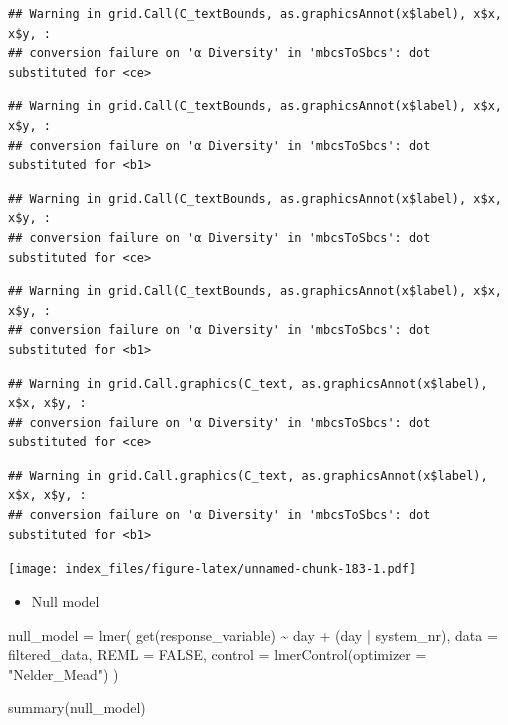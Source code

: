 \documentclass[
]{article}
\newenvironment{Shaded}{\begin{snugshade}}{\end{snugshade}}
\newcommand{\AttributeTok}[1]{\textcolor[rgb]{0.77,0.63,0.00}{#1}}
\newcommand{\ConstantTok}[1]{\textcolor[rgb]{0.00,0.00,0.00}{#1}}
\newcommand{\FunctionTok}[1]{\textcolor[rgb]{0.00,0.00,0.00}{#1}}
\newcommand{\NormalTok}[1]{#1}
\newcommand{\OtherTok}[1]{\textcolor[rgb]{0.56,0.35,0.01}{#1}}
\newcommand{\SpecialCharTok}[1]{\textcolor[rgb]{0.00,0.00,0.00}{#1}}
\newcommand{\StringTok}[1]{\textcolor[rgb]{0.31,0.60,0.02}{#1}}
\providecommand{\tightlist}{%
  \setlength{\itemsep}{0pt}\setlength{\parskip}{0pt}}
\begin{document}
\begin{verbatim}
## Warning in grid.Call(C_textBounds, as.graphicsAnnot(x$label), x$x, x$y, :
## conversion failure on 'α Diversity' in 'mbcsToSbcs': dot substituted for <ce>
\end{verbatim}

\begin{verbatim}
## Warning in grid.Call(C_textBounds, as.graphicsAnnot(x$label), x$x, x$y, :
## conversion failure on 'α Diversity' in 'mbcsToSbcs': dot substituted for <b1>
\end{verbatim}

\begin{verbatim}
## Warning in grid.Call(C_textBounds, as.graphicsAnnot(x$label), x$x, x$y, :
## conversion failure on 'α Diversity' in 'mbcsToSbcs': dot substituted for <ce>
\end{verbatim}

\begin{verbatim}
## Warning in grid.Call(C_textBounds, as.graphicsAnnot(x$label), x$x, x$y, :
## conversion failure on 'α Diversity' in 'mbcsToSbcs': dot substituted for <b1>
\end{verbatim}

\begin{verbatim}
## Warning in grid.Call.graphics(C_text, as.graphicsAnnot(x$label), x$x, x$y, :
## conversion failure on 'α Diversity' in 'mbcsToSbcs': dot substituted for <ce>
\end{verbatim}

\begin{verbatim}
## Warning in grid.Call.graphics(C_text, as.graphicsAnnot(x$label), x$x, x$y, :
## conversion failure on 'α Diversity' in 'mbcsToSbcs': dot substituted for <b1>
\end{verbatim}

\texttt{[image: index\_files/figure-latex/unnamed-chunk-183-1.pdf]}

\begin{itemize}
\tightlist
\item
  Null model
\end{itemize}

\begin{Shaded}
\begin{Highlighting}[]
\NormalTok{null\_model }\OtherTok{=} \FunctionTok{lmer}\NormalTok{(}
  \FunctionTok{get}\NormalTok{(response\_variable) }\SpecialCharTok{\textasciitilde{}}
\NormalTok{    day }\SpecialCharTok{+} 
\NormalTok{    (day }\SpecialCharTok{|}\NormalTok{ system\_nr), }
  \AttributeTok{data =}\NormalTok{ filtered\_data,}
  \AttributeTok{REML =} \ConstantTok{FALSE}\NormalTok{,}
  \AttributeTok{control =} \FunctionTok{lmerControl}\NormalTok{(}\AttributeTok{optimizer =} \StringTok{"Nelder\_Mead"}\NormalTok{)}
\NormalTok{)}

\FunctionTok{summary}\NormalTok{(null\_model)}
\end{Highlighting}
\end{Shaded}
\end{document}
